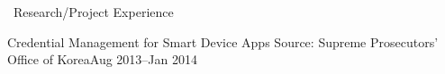 \documentclass{resume} %
\begin{document}
\begin{rSection}{\faGenderless~Research/Project Experience}
	\begin{rSubsection3}
		{Credential Management for Smart Device Apps}
		{Source: Supreme Prosecutors' Office of Korea}{Aug 2013--Jan 2014}
	\end{rSubsection3}
\end{rSection}

\end{document}
